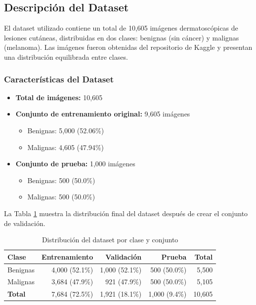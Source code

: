 \documentclass[11pt, a4paper]{article}
\begin{document}
\subsection{Descripción del Dataset}

El dataset utilizado contiene un total de 10,605 imágenes dermatoscópicas de lesiones cutáneas, distribuidas en dos clases: benignas (sin cáncer) y malignas (melanoma). Las imágenes fueron obtenidas del repositorio de Kaggle y presentan una distribución equilibrada entre clases.

\subsubsection{Características del Dataset}

\begin{itemize}
    \item \textbf{Total de imágenes:} 10,605
    \item \textbf{Conjunto de entrenamiento original:} 9,605 imágenes
    \begin{itemize}
        \item Benignas: 5,000 (52.06\%)
        \item Malignas: 4,605 (47.94\%)
    \end{itemize}
    \item \textbf{Conjunto de prueba:} 1,000 imágenes
    \begin{itemize}
        \item Benignas: 500 (50.0\%)
        \item Malignas: 500 (50.0\%)
    \end{itemize}
\end{itemize}

La Tabla \ref{tab:dataset_dist} muestra la distribución final del dataset después de crear el conjunto de validación.

\begin{table}[H]
\centering
\caption{Distribución del dataset por clase y conjunto}
\label{tab:dataset_dist}
\begin{tabular}{@{}lrrrr@{}}
\toprule
\textbf{Clase} & \textbf{Entrenamiento} & \textbf{Validación} & \textbf{Prueba} & \textbf{Total} \\
\midrule
Benignas       & 4,000 (52.1\%)         & 1,000 (52.1\%)      & 500 (50.0\%)    & 5,500 \\
Malignas       & 3,684 (47.9\%)         & 921 (47.9\%)        & 500 (50.0\%)    & 5,105 \\
\midrule
\textbf{Total} & 7,684 (72.5\%)         & 1,921 (18.1\%)      & 1,000 (9.4\%)   & 10,605 \\
\bottomrule
\end{tabular}
\end{table}
\end{document}
